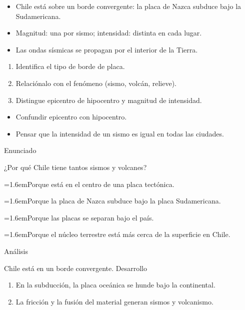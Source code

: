 \documentclass[10pt,a4paper,twocolumn]{article}
\newcommand{\alternativa}[2]{\par\noindent\hangindent=1.6em\hangafter=1\makebox[1.6em][l]{\tecla{#1}}#2\par}
\newcommand{\clave}[1]{\par\smallskip{\sffamily\footnotesize\color{esmeralda} Clave \teclaok{#1}}\par}
\begin{document}
\begin{ideasclave}
\begin{itemize}
  \item Chile está sobre un borde convergente: la placa de Nazca subduce bajo la Sudamericana.
  \item Magnitud: una por sismo; intensidad: distinta en cada lugar.
  \item Las ondas sísmicas se propagan por el interior de la Tierra.
\end{itemize}
\end{ideasclave}

\begin{metodo}
\begin{enumerate}
  \item Identifica el tipo de borde de placa.
  \item Relaciónalo con el fenómeno (sismo, volcán, relieve).
  \item Distingue epicentro de hipocentro y magnitud de intensidad.
\end{enumerate}
\end{metodo}

\begin{errorfrecuente}
\begin{itemize}
  \item Confundir epicentro con hipocentro.
  \item Pensar que la intensidad de un sismo es igual en todas las ciudades.
\end{itemize}
\end{errorfrecuente}

\begin{ejemplo}
{\sffamily\footnotesize\color{zinc500} Enunciado}\par
¿Por qué Chile tiene tantos sismos y volcanes?
\alternativa{A}{Porque está en el centro de una placa tectónica.}
\alternativa{B}{Porque la placa de Nazca subduce bajo la placa Sudamericana.}
\alternativa{C}{Porque las placas se separan bajo el país.}
\alternativa{D}{Porque el núcleo terrestre está más cerca de la superficie en Chile.}
\clave{B}
{\sffamily\footnotesize\color{zinc500} Análisis}\par Chile está en un borde convergente.
{\sffamily\footnotesize\color{zinc500} Desarrollo}
\begin{enumerate}
  \item En la subducción, la placa oceánica se hunde bajo la continental.
  \item La fricción y la fusión del material generan sismos y volcanismo.
\end{enumerate}
\end{ejemplo}
\end{document}
